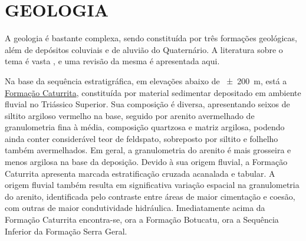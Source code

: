 \section{GEOLOGIA}
\label{sec:chap03-geologia}

A geologia é bastante complexa, sendo constituída por três formações geológicas, além de depósitos coluviais 
e de aluvião do Quaternário. A literatura sobre o tema é vasta \cite{Bortoluzzi1974, Brasil1980, 
GasparettoEtAl1988, MacielFilho1990, Machado1998, PieriniEtAl2002, MarquesEtAl2005, Milani2005, Pinto2005, 
CPRM2007, Pedron2007, Sartori2009, NascimentoEtAl2010, WerlangEtAl2010, PedronEtAl2012}, e uma revisão da 
mesma é apresentada aqui.


\def\caturrita{\href{https://pt.wikipedia.org/wiki/Forma\%C3\%A7\%C3\%A3o_Caturrita}{Formação Caturrita}}

Na base da sequência estratigráfica, em elevações abaixo de \SI{\pm200}{\metre}, está a \caturrita{}, 
constituída por material sedimentar depositado em ambiente fluvial no Triássico Superior. Sua composição é 
diversa, apresentando seixos de siltito argiloso vermelho na base, seguido por arenito avermelhado de 
granulometria fina à média, composição quartzosa e matriz argilosa, podendo ainda conter considerável teor de 
feldspato, sobreposto por siltito e folhelho também avermelhados. Em geral, a granulometria do arenito é mais 
grosseira e menos argilosa na base da deposição. Devido à sua origem fluvial, a Formação Caturrita apresenta 
marcada estratificação cruzada acanalada e tabular. A origem fluvial também resulta em significativa variação 
espacial na granulometria do arenito, identificada pelo contraste entre áreas de maior cimentação e coesão, 
com 
outras de maior condutividade hidráulica. Imediatamente acima da Formação Caturrita encontra-se, ora a 
Formação Botucatu, ora a Sequência Inferior da Formação Serra Geral.


